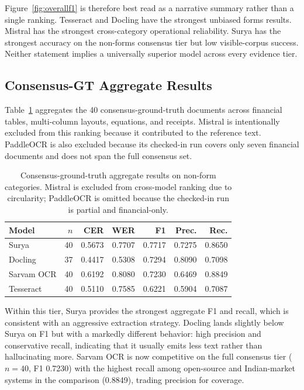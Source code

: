 \documentclass[conference]{IEEEtran}
\begin{document}
Figure~\ref{fig:overallf1} is therefore best read as a narrative summary rather than a single ranking. Tesseract and Docling have the strongest unbiased forms results. Mistral has the strongest cross-category operational reliability. Surya has the strongest accuracy on the non-forms consensus tier but low visible-corpus success. Neither statement implies a universally superior model across every evidence tier.

\subsection{Consensus-GT Aggregate Results}

Table~\ref{tab:consensus} aggregates the 40 consensus-ground-truth documents across financial tables, multi-column layouts, equations, and receipts. Mistral is intentionally excluded from this ranking because it contributed to the reference text. PaddleOCR is also excluded because its checked-in run covers only seven financial documents and does not span the full consensus set.

\begin{table}[t]
\centering
\caption{Consensus-ground-truth aggregate results on non-form categories. Mistral is excluded from cross-model ranking due to circularity; PaddleOCR is omitted because the checked-in run is partial and financial-only.}
\label{tab:consensus}
\footnotesize
\begin{tabular}{lrrrrrr}
\toprule
\textbf{Model} & \textbf{$n$} & \textbf{CER} & \textbf{WER} & \textbf{F1} & \textbf{Prec.} & \textbf{Rec.} \\
\midrule
Surya & 40 & 0.5673 & 0.7707 & 0.7717 & 0.7275 & 0.8650 \\
Docling & 37 & 0.4417 & 0.5308 & 0.7294 & 0.8090 & 0.7098 \\
Sarvam OCR & 40 & 0.6192 & 0.8080 & 0.7230 & 0.6469 & 0.8849 \\
Tesseract & 40 & 0.5110 & 0.7585 & 0.6221 & 0.5904 & 0.7087 \\
\bottomrule
\end{tabular}
\end{table}

Within this tier, Surya provides the strongest aggregate F1 and recall, which is consistent with an aggressive extraction strategy. Docling lands slightly below Surya on F1 but with a markedly different behavior: high precision and conservative recall, indicating that it usually emits less text rather than hallucinating more. Sarvam OCR is now competitive on the full consensus tier ($n=40$, F1 0.7230) with the highest recall among open-source and Indian-market systems in the comparison (0.8849), trading precision for coverage.
\end{document}
